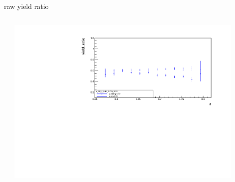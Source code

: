 \begin{frame}{raw yield ratio}
\begin{columns}
\begin{column}[T]{0.5\textwidth}
\end{column}
\begin{column}[T]{0.5\textwidth}
\includegraphics[width = 0.9\textwidth]{results/yield/statistics/x_Q2_z_0.60_4.775_0.70_ratio.pdf}
\end{column}
\end{columns}
\end{frame}
